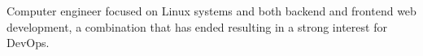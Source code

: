 Computer engineer focused on Linux systems and both backend and frontend web development, a combination that has ended resulting in a strong interest for DevOps.